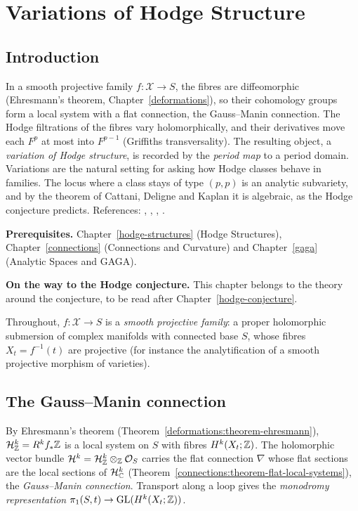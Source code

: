 \chapter{Variations of Hodge Structure}\label{vhs}

\section{Introduction}\label{vhs:section-introduction}

In a smooth projective family $f \colon \mathcal{X} \to S$, the fibres are diffeomorphic (Ehresmann's theorem, Chapter~\ref{deformations}), so their cohomology groups form a local system with a flat
connection, the Gauss--Manin connection. The Hodge filtrations of the fibres vary holomorphically, and their derivatives move each $F^p$ at most into $F^{p-1}$
(Griffiths transversality). The resulting object, a \emph{variation of Hodge structure}, is recorded by the \emph{period map} to a period domain. Variations
are the natural setting for asking how Hodge classes behave in families. The locus where a class stays of type $(p,p)$ is an analytic subvariety, and by the theorem
of Cattani, Deligne and Kaplan it is algebraic, as the Hodge conjecture predicts. References: \cite[Chapters 9 and 10]{voisin-hodge-1}, \cite{voisin-hodge-2},
\cite{carlson-muller-stach-peters}, \cite{griffiths-periods}.

\noindent\textbf{Prerequisites.} Chapter~\ref{hodge-structures} (Hodge Structures), Chapter~\ref{connections} (Connections and Curvature) and Chapter~\ref{gaga}
(Analytic Spaces and GAGA).

\noindent\textbf{On the way to the Hodge conjecture.} This chapter belongs to the theory around the conjecture, to be read after Chapter~\ref{hodge-conjecture}.

Throughout, $f \colon \mathcal{X} \to S$ is a \emph{smooth projective family}: a proper holomorphic submersion of complex manifolds with connected base $S$, whose fibres
$X_t = f^{-1}(t)$ are projective (for instance the analytification of a smooth projective morphism of varieties).

\section{The Gauss--Manin connection}\label{vhs:section-gauss-manin}

\begin{definition}\label{vhs:definition-gauss-manin}
By Ehresmann's theorem (Theorem~\ref{deformations:theorem-ehresmann}), $\mathcal{H}^k_{\mathbb{Z}} = R^kf_*\mathbb{Z}$ is a local system on $S$ with fibres $H^k(X_t; \mathbb{Z})$. The holomorphic vector bundle $\mathcal{H}^k = \mathcal{H}^k_{\mathbb{Z}} \otimes_{\mathbb{Z}}\mathcal{O}_S$ carries the
flat connection $\nabla$ whose flat sections are the local sections of $\mathcal{H}^k_{\mathbb{C}}$ (Theorem~\ref{connections:theorem-flat-local-systems}), the \emph{Gauss--Manin connection}. Transport
along a loop gives the \emph{monodromy representation} $\pi_1(S, t) \to \mathrm{GL}(H^k(X_t; \mathbb{Z}))$.
\end{definition}

